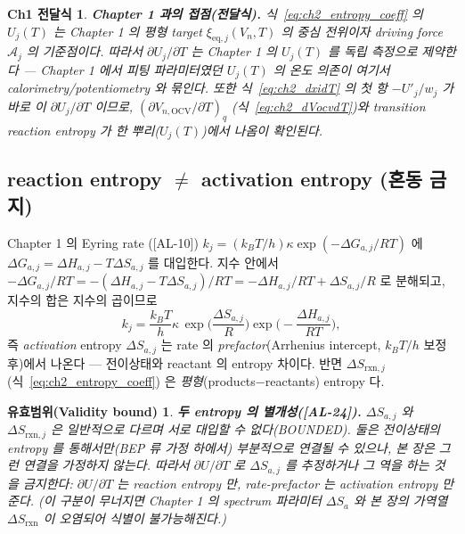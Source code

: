 \documentclass[11pt,a4paper]{article}
\newtheorem*{boundbox}{유효범위(Validity bound)}
\newtheorem*{linkbox}{Ch1 전달식}
\newcommand{\eq}{\mathrm{eq}}
\newcommand{\OCV}{\mathrm{OCV}}
\newcommand{\rxn}{\mathrm{rxn}}
\newcommand{\AL}[1]{\textsf{[AL-#1]}}
\begin{document}
\begin{linkbox}
\textbf{Chapter 1 과의 접점(전달식).} 식~\eqref{eq:ch2_entropy_coeff} 의 $U_j(T)$ 는 Chapter 1 의 평형
target $\xi_{\eq,j}(V_n,T)$ 의 \emph{중심 전위}이자 driving force $\mathcal A_j$ 의 기준점이다. 따라서
$\partial U_j/\partial T$ 는 Chapter 1 의 $U_j(T)$ 를 \emph{독립 측정으로 제약}한다 — Chapter 1 에서 피팅
파라미터였던 $U_j(T)$ 의 온도 의존이 여기서 calorimetry/potentiometry 와 묶인다. 또한 식~\eqref{eq:ch2_dxidT}
의 첫 항 $-U'_j/w_j$ 가 바로 이 $\partial U_j/\partial T$ 이므로, $(\partial V_{n,\OCV}/\partial T)_q$
(식~\eqref{eq:ch2_dVocvdT})와 transition reaction entropy 가 한 뿌리($U_j(T)$)에서 나옴이 확인된다.
\end{linkbox}

\subsection{reaction entropy $\ne$ activation entropy (혼동 금지)}\label{sec:ch2_two_entropy}
Chapter 1 의 Eyring rate \cite{eyring1935}(\AL{10}) $k_j=(k_BT/h)\kappa\exp(-\Delta G_{a,j}/RT)$ 에
$\Delta G_{a,j}=\Delta H_{a,j}-T\Delta S_{a,j}$ 를 대입한다. 지수 안에서 $-\Delta G_{a,j}/RT=
-(\Delta H_{a,j}-T\Delta S_{a,j})/RT=-\Delta H_{a,j}/RT+\Delta S_{a,j}/R$ 로 분해되고, 지수의 합은 지수의
곱이므로
\begin{equation}
k_j=\frac{k_BT}{h}\kappa\,\exp\!\Big(\frac{\Delta S_{a,j}}{R}\Big)\exp\!\Big(-\frac{\Delta H_{a,j}}{RT}\Big),
\label{eq:ch2_eyring_entropy}
\end{equation}
즉 \emph{activation} entropy $\Delta S_{a,j}$ 는 rate 의 \emph{prefactor}(Arrhenius intercept, $k_BT/h$ 보정
후)에서 나온다 — 전이상태와 reactant 의 entropy 차이다. 반면 $\Delta S_{\rxn,j}$(식~\eqref{eq:ch2_entropy_coeff})
은 \emph{평형}(products$-$reactants) entropy 다.
\begin{boundbox}
\textbf{두 entropy 의 별개성(\AL{24}).} $\Delta S_{a,j}$ 와 $\Delta S_{\rxn,j}$ 은 일반적으로 \emph{다르며}
서로 대입할 수 없다(BOUNDED). 둘은 전이상태의 entropy 를 통해서만(BEP 류 가정 하에서) 부분적으로 연결될 수
있으나, 본 장은 그런 연결을 \emph{가정하지 않는다}. 따라서 $\partial U/\partial T$ 로 $\Delta S_{a,j}$ 를
추정하거나 그 역을 하는 것을 금지한다: $\partial U/\partial T$ 는 reaction entropy 만, rate-prefactor 는
activation entropy 만 준다. (이 구분이 무너지면 Chapter 1 의 spectrum 파라미터 $\Delta S_a$ 와 본 장의 가역열
$\Delta S_\rxn$ 이 오염되어 식별이 불가능해진다.)
\end{boundbox}
\end{document}
